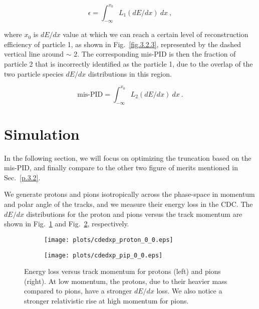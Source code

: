 \begin{equation}
    \label{eq.3.3.2.1}
    \epsilon = \int_{-\infty}^{x_{0}} L_{1}(dE/dx)~dx~,
\end{equation}

\noindent where $x_{0}$ is $dE/dx$ value at which we can reach a certain level of reconstruction efficiency of particle 1, as shown in Fig.~\ref{fig.3.2.3}, represented by the dashed vertical line around $\sim$ 2. The corresponding mis-PID is then the fraction of particle 2 that is incorrectly identified as the particle 1, due to the overlap of the two particle species $dE/dx$ distributions in this region. 

\begin{equation}
    \label{eq.3.3.2}
    \mbox{mis-PID} = \int_{-\infty}^{x_{0}} L_{2}(dE/dx)~dx~.
\end{equation}

\section{Simulation}
\label{p.3.3}

In the following section, we will focus on optimizing the truncation based on the mis-PID, and finally compare to the other two figure of merits mentioned in Sec.~\ref{p.3.2}.
~\par We generate protons and pions isotropically across the phase-space in momentum and polar angle of the tracks, and we measure their energy loss in the CDC. The $dE/dx$ distributions for the proton and pions versus the track momentum are shown in Fig.~\ref{fig.3.4.a} and Fig.~\ref{fig.3.4.b}, respectively.

\begin{figure}[H]
    \centering
    \begin{subfigure}[b]{0.5\textwidth}
        \texttt{[image: plots/cdedxp\_proton\_0\_0.eps]}
        \caption{}
        \label{fig.3.4.a} 
    \end{subfigure}\hfill
    \begin{subfigure}[b]{0.5\textwidth}
        \texttt{[image: plots/cdedxp\_pip\_0\_0.eps]}
        \caption{}
        \label{fig.3.4.b} 
    \end{subfigure}
    \caption{Energy loss versus track momentum for protons (left) and pions (right). At low momentum, the protons, due to their heavier mass compared to pions, have a stronger $dE/dx$ loss. We also notice a stronger relativistic rise at high momentum for pions.}
    \label{fig.3.4}
\end{figure}


